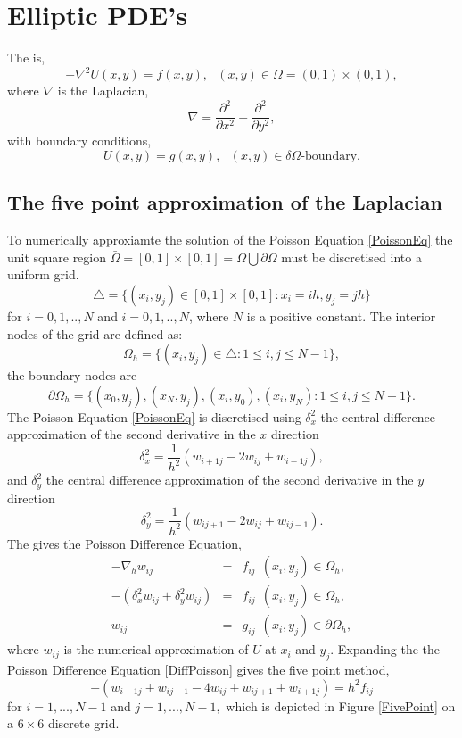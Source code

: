 \chapter{Elliptic PDE's}
The  is,
\begin{equation}
-\nabla^2U(x,y)=f(x,y), \ \ \ (x,y) \in \Omega=(0,1)\times (0,1), \label{PoissonEq} \end{equation}
where $\nabla$ is the Laplacian,
\[ \nabla = \frac{\partial^2}{\partial x^2}+\frac{\partial^2}{\partial y^2}, \]
with boundary conditions,
\[U(x,y) = g(x,y), \ \ \  (x,y)\in\delta\Omega \text{-boundary.} \]
\section{The five point approximation of the Laplacian}
To numerically approxiamte the solution of the Poisson Equation \ref{PoissonEq} the  unit square region $\bar{\Omega}=[0,1]\times[0,1]=\Omega \bigcup \partial\Omega$ must be discretised into a uniform grid.
\[ \triangle = \{(x_i,y_j)\in [0,1]\times[0,1]:x_i=ih,y_j=jh \}\]
for $i=0,1,..,N$ and $i=0,1,..,N$, where $N$ is a positive constant.
The interior nodes of the grid are defined as:
\[ \Omega_h= \{(x_i,y_j)\in \triangle:1\leq i,j\leq N-1 \},\]
the boundary nodes are
\[ \partial\Omega_h= \{(x_0,y_j),(x_{N},y_j),(x_{i},y_0),(x_{i},y_N)
:1\leq i,j\leq N-1 \}.\]
The Poisson Equation \ref{PoissonEq} is discretised using 
$\delta_x^2$ the central difference approximation of the second derivative in the $x$ direction
\[\delta_x^2=\frac{1}{h^2}(w_{i+1j}-2w_{ij}+w_{i-1j}), \]
and $\delta_y^2$ the central difference approximation of the second derivative in the $y$ direction
\[\delta_y^2=\frac{1}{h^2}(w_{ij+1}-2w_{ij}+w_{ij-1}). \]
The gives the Poisson Difference Equation,
\begin{eqnarray}
-\nabla_h w_{ij}&=&f_{ij} \ \ (x_i,y_j) \in \Omega_h, \\
-(\delta_x^2w_{ij}+\delta_y^2w_{ij})&=&f_{ij} \ \ (x_i,y_j) \in \Omega_h, \\
w_{ij}&=&g_{ij} \ \ (x_i,y_j) \in \partial\Omega_h, \label{DiffPoisson}
\end{eqnarray}
where $w_{ij}$ is the numerical approximation of $U$ at $x_i$ and $y_j$.
Expanding the  the Poisson Difference Equation \ref{DiffPoisson} gives the five point method,
\[-(w_{i-1j}+w_{ij-1}-4w_{ij}+w_{ij+1}+w_{i+1j})=h^2f_{ij} \]
for $i=1,...,N-1$ and $j=1,...,N-1,$ which is depicted in Figure \ref{FivePoint} on a $6 \times 6$ discrete grid.

